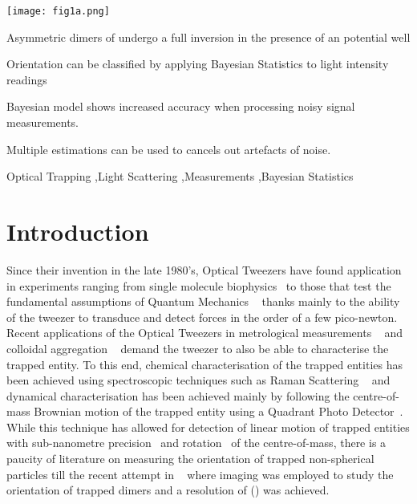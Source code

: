 \documentclass[final,3p, twocolumn]{elsarticle}
\begin{document}
\begin{frontmatter}
\begin{abstract}
\end{abstract}

\begin{graphicalabstract}
	\centering
	\texttt{[image: fig1a.png]}
\end{graphicalabstract}

\begin{highlights}
\item Asymmetric dimers of undergo a full inversion in the presence of an potential well
\item Orientation can be classified by applying Bayesian Statistics to light intensity readings
\item Bayesian model shows increased accuracy when processing noisy signal measurements. 
\item Multiple estimations can be  used to cancels out artefacts of noise. 
\end{highlights}

\begin{keyword}
	Optical Trapping \sep Light Scattering \sep Measurements \sep Bayesian Statistics

\end{keyword}

\end{frontmatter}


\section{Introduction}
\label{1}

Since their invention in the late 1980's, Optical Tweezers have found application in experiments ranging from single molecule biophysics~\cite{Wang 2021} to those that test the fundamental assumptions of Quantum Mechanics ~\cite{Duan 2013} thanks mainly to the ability of the tweezer to transduce and detect forces in the order of a few pico-newton. Recent applications of the Optical Tweezers in metrological measurements ~\cite{Scott Waitukaitis} and colloidal aggregation ~\cite{Optical Binding} demand the tweezer to also be able to characterise  the trapped entity. To this end, chemical characterisation of the trapped entities has been achieved using spectroscopic techniques such as Raman Scattering ~\cite{P K Gupta} and dynamical characterisation has been achieved mainly by following the centre-of-mass Brownian motion of the trapped entity using a Quadrant Photo Detector~\cite{Alexander Rohrbach}. While this technique has allowed for detection of linear motion of trapped entities  with sub-nanometre precision~\cite{Alexander Rohrbach} and  rotation~\cite{recent paper} of the centre-of-mass, there is a paucity of literature on measuring the orientation of trapped non-spherical particles till the recent attempt in ~\cite{New Zealand paper} where imaging was employed to study the orientation of trapped dimers and a resolution of () was achieved.   
\end{document}
